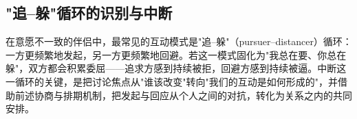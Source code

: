 \subsection{"追--躲"循环的识别与中断}

在意愿不一致的伴侣中，最常见的互动模式是"追--躲"（pursuer--distancer）循环：一方更频繁地发起，另一方更频繁地回避。若这一模式固化为"我总在要、你总在躲"，双方都会积累委屈——追求方感到持续被拒，回避方感到持续被逼。中断这一循环的关键，是把讨论焦点从"谁该改变"转向"我们的互动是如何形成的"，并借助前述协商与排期机制，把发起与回应从个人之间的对抗，转化为关系之内的共同安排。
